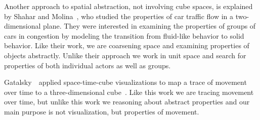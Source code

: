 Another approach to spatial abstraction, not involving cube spaces, is explained by Shahar and Molina~\cite{shahar1998knowledge}, who studied the properties of car traffic flow in a two-dimensional plane.
They were interested in examining the properties of groups of cars in congestion by modeling the transition from fluid-like behavior to solid behavior.
Like their work, we are coarsening space and examining properties of objects abstractly.
Unlike their approach we work in unit space and search for properties of both individual actors as well as groups.

Gatalsky~\etal~applied space-time-cube visualizations to map a trace of movement over time to a three-dimensional cube~\cite{gatalsky2004interactive}.
Like this work we are tracing movement over time, but unlike this work we reasoning about abstract properties and our main purpose is not visualization, but properties of movement.



